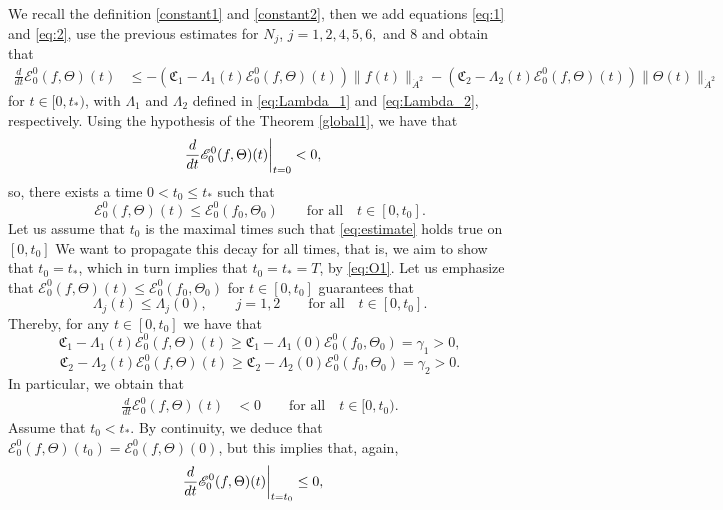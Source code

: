 \documentclass[reqno,11pt]{amsart}
\begin{document}
{We recall the definition \eqref{constant1} and \eqref{constant2}, then we add equations \eqref{eq:1} and \eqref{eq:2}, use the previous estimates for $N_j$, $j=1,2,4,5,6,$ and 8 and  obtain that
\begin{align}\label{eq:energyE}
\frac{d}{dt}\mathscr{E}_0^0(f,\Theta)(t)&\leq -\left(\mathfrak{C}_1-\Lambda_1(t)\mathscr{E}_0^0(f,\Theta)(t)\right)\|f(t)\|_{\dot{A}^2}-\left(\mathfrak{C}_2-\Lambda_2(t)\mathscr{E}_0^0(f,\Theta)(t)\right)\|\Theta(t)\|_{\dot{A}^2}
\end{align}
 for $t\in[0,t_*)$,
with $\Lambda_1$ and $\Lambda_2$ defined in \eqref{eq:Lambda_1} and \eqref{eq:Lambda_2},  respectively. 
Using the hypothesis of the Theorem \ref{global1}, we have that
\begin{align*}
\frac{d}{dt}\mathscr{E}^0_0(f,\Theta)(t)\bigg{|}_{t=0}&<0,
\end{align*}
so, there exists a time $0<t_0\leq t_*$ such that
\begin{equation}\label{eq:estimate}
\mathscr{E}_0^0(f,\Theta)(t)\leq \mathscr{E}^0_0(f_0,\Theta_0)\qquad \mbox{for all}\quad t\in [0,t_0].
\end{equation}
Let us assume that $t_0$ is the maximal times such that \eqref{eq:estimate} holds true on $[0,t_0]$
We want to propagate this decay for all times, that is, we aim to show that $t_0=t_*$, which in turn implies that $t_0=t_*=T$, by \eqref{eq:O1}. Let us emphasize that $\mathscr{E}_0^0(f,\Theta)(t)\leq \mathscr{E}^0_0(f_0,\Theta_0)$ for $t\in [0,t_0]$ guarantees that
\begin{equation}\label{eq:Ldecay}
\Lambda_j(t)\leq \Lambda_j(0),\qquad j=1,2 \qquad\mbox{for all}\quad t\in [0,t_0].
\end{equation}
Thereby, for any $t\in [0,t_0]$ we have that
$$
\mathfrak{C}_1-\Lambda_1(t)\mathscr{E}^0_0(f,\Theta)(t)\geq \mathfrak{C}_1-\Lambda_1(0)\mathscr{E}^0_0(f_0,\Theta_0)=\gamma_1>0,
$$
$$
\mathfrak{C}_2-\Lambda_2(t)\mathscr{E}^0_0(f,\Theta)(t)\geq \mathfrak{C}_2-\Lambda_2(0)\mathscr{E}^0_0(f_0,\Theta_0)=\gamma_2>0.
$$
In particular, we obtain that 
\begin{align*}
\frac{d}{dt}\mathscr{E}_0^0(f,\Theta)(t)&< 0\qquad\mbox{for all}\quad t\in [0,t_0).
\end{align*}
Assume that $t_0<t_*$. By continuity, we deduce that $\mathscr{E}_0^0(f,\Theta)(t_0)=\mathscr{E}_0^0(f,\Theta)(0)$, but this implies that, again, 
\begin{align*}
\frac{d}{dt}\mathscr{E}_0^0(f,\Theta)(t)\bigg{|}_{t=t_0}&\leq 0,
\end{align*}
}
\end{document}
